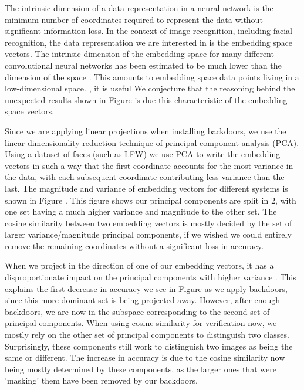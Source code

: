 \documentclass{article}
\theoremstyle{plain}
\theoremstyle{definition}
\theoremstyle{remark}
\begin{document}
The intrinsic dimension of a data representation in a neural network is the minimum number of coordinates required to represent the data without significant information loss. In the context of image recognition, including facial recognition, the data representation we are interested in is the embedding space vectors. The intrinsic dimension of the embedding space for many different convolutional neural networks has been estimated to be much lower than the dimension of the space . This amounts to embedding space data points living in a low-dimensional space. , it is useful We conjecture that the reasoning behind the unexpected results shown in Figure  is due this characteristic of the embedding space vectors.

Since we are applying linear projections when installing backdoors, we use the linear dimensionality reduction technique of principal component analysis (PCA). Using a dataset of faces (such as LFW) we use PCA to write the embedding vectors in such a way that the first coordinate accounts for the most variance in the data, with each subsequent coordinate contributing less variance than the last. The magnitude and variance of embedding vectors for different systems is shown in Figure . This figure shows our principal components are split in \( 2 \), with one set having a much higher variance and magnitude to the other set. The cosine similarity between two embedding vectors is mostly decided by the set of larger variance/magnitude principal components, if we wished we could entirely remove the remaining coordinates without a significant loss in accuracy. 

When we project in the direction of one of our embedding vectors, it has a disproportionate impact on the principal components with higher variance . This explains the first decrease in accuracy we see in Figure  as we apply backdoors, since this more dominant set is being projected away. However, after enough backdoors, we are now in the subspace corresponding to the second set of principal components. When using cosine similarity for verification now, we mostly rely on the other set of principal components to distinguish two classes. Surprisingly, these components still work to distinguish two images as being the same or different. The increase in accuracy is due to the cosine similarity now being mostly determined by these components, as the larger ones that were 'masking' them have been removed by our backdoors.
\end{document}
